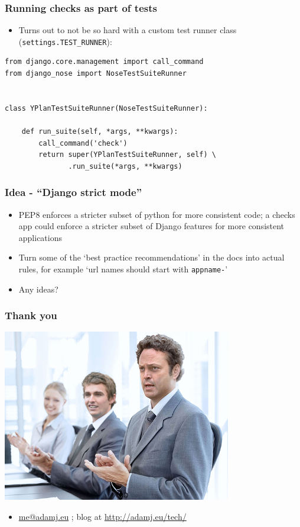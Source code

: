 \documentclass{beamer}
\begin{document}
\begin{frame}[fragile]\frametitle{Running checks as part of tests}

    \begin{itemize}
        \item Turns out to not be so hard with a custom test runner class (\texttt{settings.TEST\_RUNNER}):
    \end{itemize}

    \begin{lstlisting}
from django.core.management import call_command
from django_nose import NoseTestSuiteRunner


class YPlanTestSuiteRunner(NoseTestSuiteRunner):

    def run_suite(self, *args, **kwargs):
        call_command('check')
        return super(YPlanTestSuiteRunner, self) \
               .run_suite(*args, **kwargs)
    \end{lstlisting}

\end{frame}


\begin{frame}[fragile]\frametitle{Idea - ``Django strict mode''}

    \begin{itemize}
        \item PEP8 enforces a stricter subset of python for more consistent code; a checks app could enforce a stricter subset of Django features for more consistent applications
        \item Turn some of the `best practice recommendations' in the docs into actual rules, for example `url names should start with \texttt{appname-}'
        \item Any ideas?
    \end{itemize}

\end{frame}


\begin{frame}[fragile]\frametitle{Thank you}

    \begin{center}
        \includegraphics[width=10cm]{clapping}
    \end{center}

    \begin{itemize}
        \item \url{me@adamj.eu} ; blog at \url{http://adamj.eu/tech/}
    \end{itemize}

\end{frame}
\end{document}
